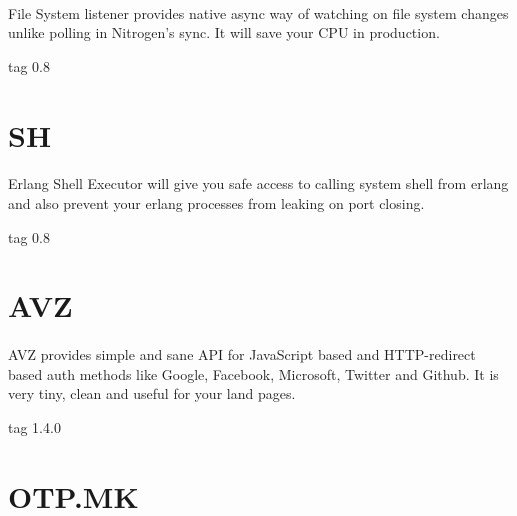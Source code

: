 \documentclass[11pt]{article}
\begin{document}
\paragraph{}
File System listener provides native async way of watching on
file system changes unlike polling in Nitrogen's sync. It will save
your CPU in production.

 tag 0.8

\section*{SH}
\paragraph{}
Erlang Shell Executor will give you safe access to calling system shell
from erlang and also prevent your erlang processes from leaking on port closing.

 tag 0.8

\section*{AVZ}
\paragraph{}
AVZ provides simple and sane API for JavaScript based and HTTP-redirect
based auth methods like Google, Facebook, Microsoft, Twitter and Github.
It is very tiny, clean and useful for your land pages.

 tag 1.4.0


\section*{OTP.MK}
\paragraph{}
\end{document}
